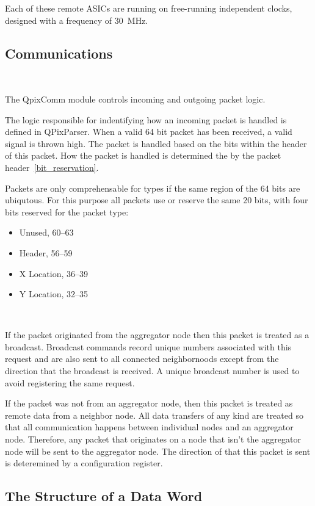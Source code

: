 Each of these remote ASICs are running on free-running independent clocks, designed with a frequency of 30~\unit{MHz}.

\subsection{Communications}~\label{sec:digi_communications}

The QpixComm module controls incoming and outgoing packet logic.

The logic responsible for indentifying how an incoming packet is handled is defined in QPixParser.
When a valid 64 bit packet has been received, a valid signal is thrown high.
The packet is handled based on the bits within the header of this packet.
How the packet is handled is determined the by the packet header~\ref{bit_reservation}.

Packets are only comprehensable for types if the same region of the 64 bits are ubiqutous.
For this purpose all packets use or reserve the same 20 bits, with four bits reserved for the packet type:

\begin{itemize}
    \item Unused, 60--63
    \item Header, 56--59
    \item X Location, 36--39
    \item Y Location, 32--35
\end{itemize}~\label{bit_reservation}

If the packet originated from the aggregator node then this packet is treated as a broadcast.
Broadcast commands record unique numbers associated with this request and are also sent to all connected neighbornoods except from the direction that the broadcast is received.
A unique broadcast number is used to avoid registering the same request.

If the packet was not from an aggregator node, then this packet is treated as remote data from a neighbor node.
All data transfers of any kind are treated so that all communication happens between individual nodes and an aggregator node.
Therefore, any packet that originates on a node that isn't the aggregator node will be sent to the aggregator node.
The direction of that this packet is sent is deteremined by a configuration register.

\subsection{The Structure of a Data Word}

